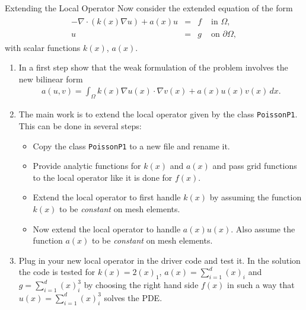 \documentclass[12pt,a4paper]{article}
\begin{document}
\begin{Exercise}{Extending the Local Operator}
Now consider the extended equation of the form
\begin{align}
    \begin{array}{rcll}
      -\nabla\cdot (k(x) \nabla u) +a(x) u  & = & f & \text{ in } \Omega, \\
      u & = & g & \text{ on } \partial\Omega,
    \end{array}
\end{align}
with scalar functions $k(x)$, $a(x)$.

\begin{enumerate}
\item In a first step show that the weak formulation of the problem
  involves the new bilinear form
  \begin{align}
    a(u,v) = \int_\Omega k(x) \nabla u(x) \cdot \nabla v(x) + a(x) u(x) v(x) \,dx .
  \end{align}
\item The main work is to extend the local operator given by the class
  \lstinline{PoissonP1}. This can be done in several steps:
  \begin{itemize}
  \item Copy the class \lstinline{PoissonP1} to a new file and rename it.
  \item Provide analytic functions for $k(x)$ and $a(x)$ and pass
    grid functions to the local operator like it is done for $f(x)$.
  \item Extend the local operator to first handle $k(x)$ by assuming the
    function $k(x)$ to be \emph{constant} on mesh elements.
  \item Now extend the local operator to handle $a(x) u(x)$. Also assume
    the function $a(x)$ to be \emph{constant} on mesh elements.
  \end{itemize}
\item Plug in your new local operator in the driver code and test it.
  In the solution the code is tested for $k(x)=2(x)_1$,
  $a(x)=\sum_{i=1}^{d}(x)_i$ and $g=\sum_{i=1}^d (x)_i^3$ by choosing
  the right hand side $f(x)$ in such a way that $u(x)=\sum_{i=1}^d
  (x)_i^3$ solves the PDE.
\end{enumerate}
\end{Exercise}
\end{document}
